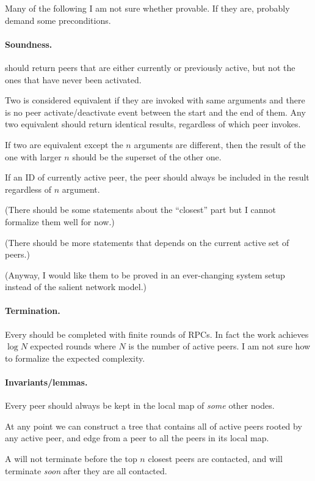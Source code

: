 Many of the following I am not sure whether provable.
If they are, probably demand some preconditions.

\paragraph{Soundness.}
\find should return peers that are either currently or previously active, but not the ones that have never been activated.

Two \find is considered equivalent if they are invoked with same arguments and there is no peer activate/deactivate event between the start and the end of them.
Any two equivalent \find should return identical results, regardless of which peer invokes.

If two \find are equivalent except the $n$ arguments are different, then the result of the one with larger $n$ should be the superset of the other one.

If \find an ID of currently active peer, the peer should always be included in the result regardless of $n$ argument.

(There should be some statements about the ``closest'' part but I cannot formalize them well for now.)

(There should be more statements that depends on the current active set of peers.)

(Anyway, I would like them to be proved in an ever-changing system setup instead of the salient network model.)

\paragraph{Termination.}
Every \find should be completed with finite rounds of RPCs.
In fact the work achieves $\log{N}$ expected rounds where $N$ is the number of active peers.
I am not sure how to formalize the expected complexity.

\paragraph{Invariants/lemmas.}
Every peer should always be kept in the local map of \emph{some} other nodes.

At any point we can construct a tree that contains all of active peers rooted by any active peer, and edge from a peer to all the peers in its local map.

A \find will not terminate before the top $n$ closest peers are contacted, and will terminate \emph{soon} after they are all contacted.